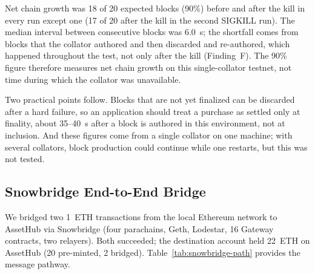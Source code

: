 Net chain growth was 18 of 20 expected blocks (90\%) before and after the kill in every run except one (17 of 20 after the kill in the second SIGKILL run). The median interval between consecutive blocks was 6.0~s; the shortfall comes from blocks that the collator authored and then discarded and re-authored, which happened throughout the test, not only after the kill (Finding~F). The 90\% figure therefore measures net chain growth on this single-collator testnet, not time during which the collator was unavailable.

Two practical points follow. Blocks that are not yet finalized can be discarded after a hard failure, so an application should treat a purchase as settled only at finality, about 35--40~s after a block is authored in this environment, not at inclusion. And these figures come from a single collator on one machine; with several collators, block production could continue while one restarts, but this was not tested.

\subsection{Snowbridge End-to-End Bridge}\label{subsec:snowbridge-bridge}

We bridged two 1~ETH transactions from the local Ethereum network to AssetHub via Snowbridge (four parachains, Geth, Lodestar, 16 Gateway contracts, two relayers). Both succeeded; the destination account held 22~ETH on AssetHub (20 pre-minted, 2 bridged). Table~\ref{tab:snowbridge-path} provides the message pathway.

